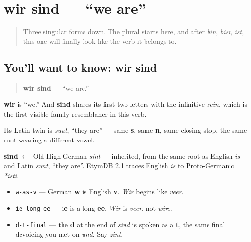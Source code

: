 \section[wir sind]{wir sind — \textquotedblleft{}we are\textquotedblright{}}

\label{lesson:GE-C16-wir-sind}



\begin{quote}
Three singular forms down. The plural starts here, and after \emph{bin}, \emph{bist}, \emph{ist}, this one will finally look like the verb it belongs to.
\end{quote}

\subsection*{You'll want to know: wir sind}
\begin{quote}
\textbf{wir sind} — \textquotedblleft{}we are.\textquotedblright{}
\end{quote}

\textbf{wir} is \textquotedblleft{}we.\textquotedblright{} And \textbf{sind} shares its first two letters with the infinitive \emph{sein}, which is the first visible family resemblance in this verb.

Its Latin twin is \emph{sunt}, \textquotedblleft{}they are\textquotedblright{} — same \textbf{s}, same \textbf{n}, same closing stop, the same root wearing a different vowel.

\begin{cousinweb}
\textbf{sind} $\leftarrow$ Old High German \emph{sint} — inherited, from the same root as English \emph{is} and Latin \emph{sunt}, \textquotedblleft{}they are\textquotedblright{}. EtymDB 2.1 traces English \emph{is} to Proto-Germanic \emph{*isti}.
\end{cousinweb}

\begin{sounds}
\begin{itemize}
\raggedright
  \item \texttt{w-as-v} — German \textbf{w} is English \textbf{v}. \emph{Wir} begins like \emph{veer}.
  \item \texttt{ie-long-ee} — \textbf{ie} is a long \textbf{ee}. \emph{Wir} is \emph{veer}, not \emph{wire}.
  \item \texttt{d-t-final} — the \textbf{d} at the end of \emph{sind} is spoken as a \textbf{t}, the same final devoicing you met on \emph{und}. Say \emph{zint}.
\end{itemize}
\end{sounds}

